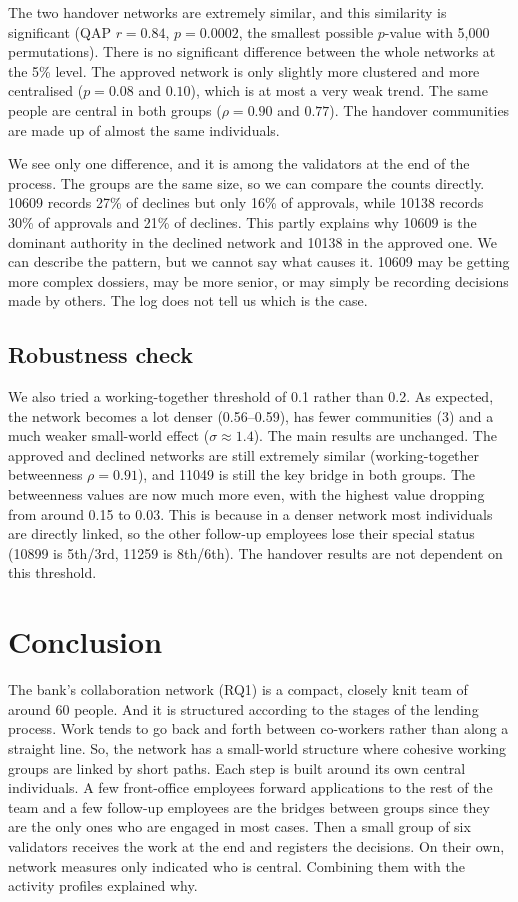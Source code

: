 \documentclass[12pt, a4paper]{article}
\begin{document}
The two handover networks are extremely similar, and this similarity is significant (QAP $r = 0.84$, $p = 0.0002$, the smallest possible $p$-value with 5,000 permutations). There is no significant difference between the whole networks at the 5\% level. The approved network is only slightly more clustered and more centralised ($p = 0.08$ and $0.10$), which is at most a very weak trend. The same people are central in both groups ($\rho = 0.90$ and $0.77$). The handover communities are made up of almost the same individuals.

We see only one difference, and it is among the validators at the end of the process. The groups are the same size, so we can compare the counts directly. 10609 records 27\% of declines but only 16\% of approvals, while 10138 records 30\% of approvals and 21\% of declines. This partly explains why 10609 is the dominant authority in the declined network and 10138 in the approved one. We can describe the pattern, but we cannot say what causes it. 10609 may be getting more complex dossiers, may be more senior, or may simply be recording decisions made by others. The log does not tell us which is the case.

\subsection{Robustness check}
\label{sec:robustness}

We also tried a working-together threshold of 0.1 rather than 0.2. As expected, the network becomes a lot denser (0.56--0.59), has fewer communities (3) and a much weaker small-world effect ($\sigma \approx 1.4$). The main results are unchanged. The approved and declined networks are still extremely similar (working-together betweenness $\rho = 0.91$), and 11049 is still the key bridge in both groups. The betweenness values are now much more even, with the highest value dropping from around 0.15 to 0.03. This is because in a denser network most individuals are directly linked, so the other follow-up employees lose their special status (10899 is 5th/3rd, 11259 is 8th/6th). The handover results are not dependent on this threshold.

\section{Conclusion}
\label{conclusion}

The bank's collaboration network (RQ1) is a compact, closely knit team of around 60 people. And it is structured according to the stages of the lending process. Work tends to go back and forth between co-workers rather than along a straight line. So, the network has a small-world structure where cohesive working groups are linked by short paths. Each step is built around its own central individuals. A few front-office employees forward applications to the rest of the team and a few follow-up employees are the bridges between groups since they are the only ones who are engaged in most cases. Then a small group of six validators receives the work at the end and registers the decisions. On their own, network measures only indicated who is central. Combining them with the activity profiles explained why.
\end{document}
